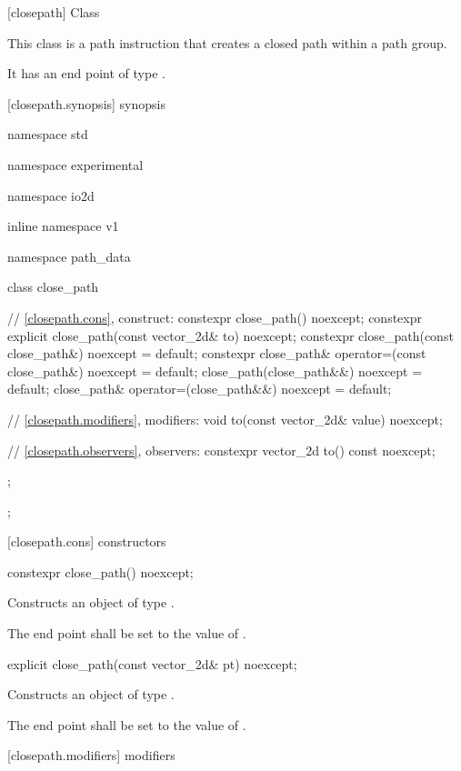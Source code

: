  [closepath] {Class }

\pnum
{}
This class is a path instruction that creates a closed path within a path group.

\pnum
It has an end point of type .

 [closepath.synopsis] { synopsis}

\begin{codeblock}
namespace std { namespace experimental { namespace io2d { inline namespace v1 {
  namespace path_data {
    class close_path {
      // \ref{closepath.cons}, construct:
      constexpr close_path() noexcept;
      constexpr explicit close_path(const vector_2d& to) noexcept;
      constexpr close_path(const close_path&) noexcept = default;
      constexpr close_path& operator=(const close_path&) noexcept = default;
      close_path(close_path&&) noexcept = default;
      close_path& operator=(close_path&&) noexcept = default;

      // \ref{closepath.modifiers}, modifiers:
      void to(const vector_2d& value) noexcept;

      // \ref{closepath.observers}, observers:
      constexpr vector_2d to() const noexcept;
    };
  };
} } } }
\end{codeblock}

 [closepath.cons] { constructors}

\begin{itemdecl}
constexpr close_path() noexcept;
\end{itemdecl}
\begin{itemdescr}
\pnum
\effects
Constructs an object of type .

\pnum
The end point shall be set to the value of .
\end{itemdescr}

\begin{itemdecl}
explicit close_path(const vector_2d& pt) noexcept;
\end{itemdecl}
\begin{itemdescr}
\pnum
\effects
Constructs an object of type .

\pnum
The end point shall be set to the value of .
\end{itemdescr}

 [closepath.modifiers]{ modifiers}

